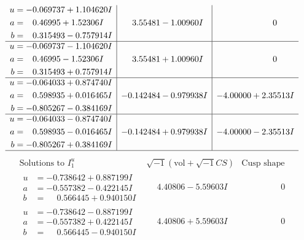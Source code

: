 \documentclass[1p]{elsarticle_modified}
\theoremstyle{definition}
\newcommand{\I}{\sqrt{-1}}
\begin{document}
$$\begin{array}{c|c|c}
\begin{aligned}
u &= -0.069737 + 1.104620 I \\
a &= \phantom{-}0.46995 + 1.52306 I \\
b &= \phantom{-}0.315493 - 0.757914 I\end{aligned}
 & \phantom{-}3.55481 - 1.00960 I & \phantom{-0.000000 } 0 \\ \hline\begin{aligned}
u &= -0.069737 - 1.104620 I \\
a &= \phantom{-}0.46995 - 1.52306 I \\
b &= \phantom{-}0.315493 + 0.757914 I\end{aligned}
 & \phantom{-}3.55481 + 1.00960 I & \phantom{-0.000000 } 0 \\ \hline\begin{aligned}
u &= -0.064033 + 0.874740 I \\
a &= \phantom{-}0.598935 + 0.016465 I \\
b &= -0.805267 - 0.384169 I\end{aligned}
 & -0.142484 - 0.979938 I & -4.00000 + 2.35513 I \\ \hline\begin{aligned}
u &= -0.064033 - 0.874740 I \\
a &= \phantom{-}0.598935 - 0.016465 I \\
b &= -0.805267 + 0.384169 I\end{aligned}
 & -0.142484 + 0.979938 I & -4.00000 - 2.35513 I\\
 \hline 
 \end{array}$$\newpage$$\begin{array}{c|c|c}  
\text{Solutions to }I^u_{1}& \I (\text{vol} + \sqrt{-1}CS) & \text{Cusp shape}\\
 \hline 
\begin{aligned}
u &= -0.738642 + 0.887199 I \\
a &= -0.557382 - 0.422145 I \\
b &= \phantom{-}0.566445 + 0.940150 I\end{aligned}
 & \phantom{-}4.40806 - 5.59603 I & \phantom{-0.000000 } 0 \\ \hline\begin{aligned}
u &= -0.738642 - 0.887199 I \\
a &= -0.557382 + 0.422145 I \\
b &= \phantom{-}0.566445 - 0.940150 I\end{aligned}
 & \phantom{-}4.40806 + 5.59603 I & \phantom{-0.000000 } 0 \\ \hline\begin{aligned}

\end{aligned}
\end{array}$$
\end{document}
